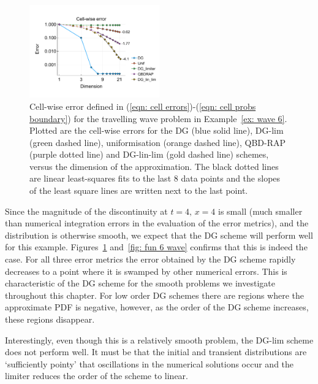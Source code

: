 \begin{example}
	\begin{figure}[h]
		\centering
		\includegraphics[width=0.5\textwidth,trim={0.75cm 0.8cm 0.25cm 1.25cm},clip]{chapter6/figs/wave/fun6/L1_cell_probs.pdf}
		\caption{Cell-wise error defined in (\ref{eqn: cell errors})-(\ref{eqn: cell probs boundary}) for the travelling wave problem in Example~\ref{ex: wave 6}. Plotted are the cell-wise errors for the DG (blue solid line), DG-lim (green dashed line), uniformisation (orange dashed line), QBD-RAP (purple dotted line) and DG-lin-lim (gold dashed line) schemes, versus the dimension of the approximation. The black dotted lines are linear least-squares fits to the last 8 data points and the slopes of the least square lines are written next to the last point.}  
		\label{fig: fun 6 wave cp} 
	\end{figure}
	Since the magnitude of the discontinuity at \(t=4,\,x=4\) is small (much smaller than numerical integration errors in the evaluation of the error metrics), and the distribution is otherwise smooth, we expect that the DG scheme will perform well for this example. Figures~\ref{fig: fun 6 wave cp} and~\ref{fig: fun 6 wave} confirms that this is indeed the case. For all three error metrics the error obtained by the DG scheme rapidly decreases to a point where it is swamped by other numerical errors. This is characteristic of the DG scheme for the smooth problems we investigate throughout this chapter. For low order DG schemes there are regions where the approximate PDF is negative, however, as the order of the DG scheme increases, these regions disappear. 
	
	Interestingly, even though this is a relatively smooth problem, the DG-lim scheme does not perform well. It must be that the initial and transient distributions are `sufficiently pointy' that oscillations in the numerical solutions occur and the limiter reduces the order of the scheme to linear. 
	

\end{example}
